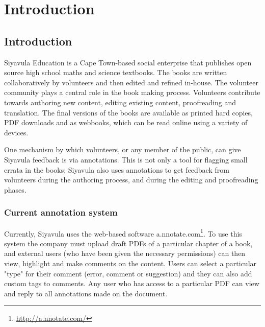 
\chapter{Introduction} %

\label{Chapter1} %



\section{Introduction}
Siyavula Education is a Cape Town-based social enterprise that publishes open source high school maths and science textbooks. The books are written collaboratively by volunteers and then edited and refined in-house. The volunteer community plays a central role in the book making process. Volunteers contribute towards authoring new content, editing existing content, proofreading and translation. The final versions of the books are available as printed hard copies, PDF downloads and as webbooks, which can be read online using a variety of devices. 

One mechanism by which volunteers, or any member of the public, can give Siyavula feedback is via annotations. This is not only a tool for flagging small errata in the books; Siyavula also uses annotations to get feedback from volunteers during the authoring process, and during the editing and proofreading phases.


\subsection{Current annotation system}

Currently, Siyavula uses the web-based software a.nnotate.com\footnote{\href{ http://a.nnotate.com/}{ http://a.nnotate.com/}}. To use this system the company must upload draft PDFs of a particular chapter of a book, and external users (who have been given the necessary permissions) can then view, highlight and make comments on the content. Users can select a particular "type" for their comment (error, comment or suggestion) and they can also add custom tags to comments. Any user who has access to a particular PDF can view and reply to all annotations made on the document. 

